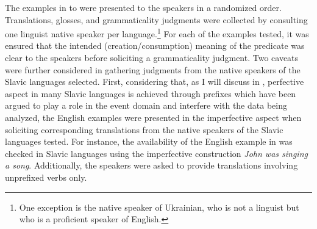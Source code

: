 \documentclass[output=paper,colorlinks,citecolor=brown]{langscibook}
\begin{document}
The examples in  to  were presented to the speakers in a randomized order. Translations, glosses, and grammaticality judgments were collected by consulting one linguist native speaker per language.\footnote{One exception is the native speaker of Ukrainian, who is not a linguist but who is a proficient speaker of English. %
} For each of the examples tested, it was ensured that the intended (creation/consumption) meaning of the predicate was clear to the speakers before soliciting a grammaticality judgment. Two caveats were further considered in gathering judgments from the native speakers of the Slavic languages selected. %
First, considering that, as I will discuss in , perfective aspect in many Slavic languages is achieved through prefixes which have been argued to play a role in the event domain and interfere with the data being analyzed, the English examples were presented in the imperfective aspect when soliciting corresponding translations from the native speakers of the Slavic languages tested.
For instance, the availability of the English example in  was checked in Slavic languages using the imperfective construction \textit{John was singing a song}. Additionally, the speakers were asked to provide translations involving unprefixed verbs only. %
\end{document}
